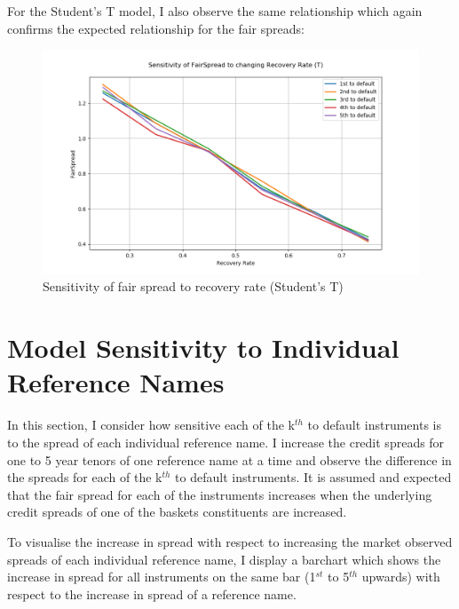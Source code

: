 \documentclass{report}
\theoremstyle{plain}
\theoremstyle{definition}
\begin{document}
For the Student's T model, I also observe the same relationship which again confirms the expected relationship for the fair spreads: 

\begin{figure}[H]
	\begin{center}
		\includegraphics[width=15cm]{Sensitivity_of_FairSpread_to_changing_Recovery_Rate_(T).png}
		\caption{Sensitivity of fair spread to recovery rate (Student's T)} 
		\label{Sensitivity_of_FairSpread_to_changing_Recovery_Rate_(T)}
	\end{center}
\end{figure}

\section{Model Sensitivity to Individual Reference Names}

In this section, I consider how sensitive each of the k$^{th}$ to default instruments is to the spread of each individual reference name. I increase the credit spreads for one to 5 year tenors of one reference name at a time and observe the difference in the spreads for each of the k$^{th}$ to default instruments. It is assumed and expected that the fair spread for each of the instruments increases when the underlying credit spreads of one of the baskets constituents are increased.

To visualise the increase in spread with respect to increasing the market observed spreads of each individual reference name, I display a barchart which shows the increase in spread for all instruments on the same bar (1$^{st}$ to 5$^{th}$ upwards) with respect to the increase in spread of a reference name.
\end{document}
